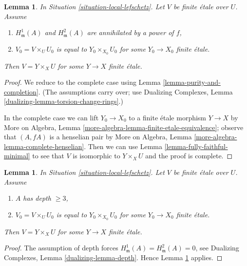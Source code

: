 \documentclass{stacks-project}
\theoremstyle{plain}
\newtheorem{lemma}[subsection]{Lemma}
\theoremstyle{definition}
\theoremstyle{remark}
\numberwithin{equation}{subsection}
\begin{document}
\begin{lemma}
\label{lemma-lift-purity-general}
In Situation \ref{situation-local-lefschetz}.
Let $V$ be finite \'etale over $U$. Assume
\begin{enumerate}
\item $H^1_\mathfrak m(A)$ and $H^2_\mathfrak m(A)$
are annihilated by a power of $f$,
\item $V_0 = V \times_U U_0$ is equal to $Y_0 \times_{X_0} U_0$
for some $Y_0 \to X_0$ finite \'etale.
\end{enumerate}
Then $V = Y \times_X U$ for some $Y \to X$ finite \'etale.
\end{lemma}

\begin{proof}
We reduce to the complete case using Lemma \ref{lemma-purity-and-completion}.
(The assumptions carry over; use Dualizing Complexes, Lemma
\ref{dualizing-lemma-torsion-change-rings}.)

\medskip\noindent
In the complete case we can lift $Y_0 \to X_0$ to a finite \'etale
morphism $Y \to X$ by
More on Algebra, Lemma \ref{more-algebra-lemma-finite-etale-equivalence};
observe that $(A, fA)$ is a henselian pair by
More on Algebra, Lemma \ref{more-algebra-lemma-complete-henselian}.
Then we can use Lemma \ref{lemma-fully-faithful-minimal}
to see that $V$ is isomorphic to $Y \times_X U$ and
the proof is complete.
\end{proof}

\begin{lemma}
\label{lemma-lift-purity}
In Situation \ref{situation-local-lefschetz}.
Let $V$ be finite \'etale over $U$. Assume
\begin{enumerate}
\item $A$ has depth $\geq 3$,
\item $V_0 = V \times_U U_0$ is equal to $Y_0 \times_{X_0} U_0$
for some $Y_0 \to X_0$ finite \'etale.
\end{enumerate}
Then $V = Y \times_X U$ for some $Y \to X$ finite \'etale.
\end{lemma}

\begin{proof}
The assumption of depth forces
$H^1_\mathfrak m(A) = H^2_\mathfrak m(A) = 0$, see
Dualizing Complexes, Lemma \ref{dualizing-lemma-depth}.
Hence Lemma \ref{lemma-lift-purity-general} applies.
\end{proof}
\end{document}
